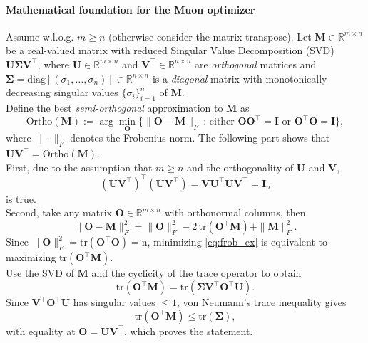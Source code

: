 \paragraph*{Mathematical foundation for the Muon optimizer} Assume w.l.o.g. $m \ge n$ (otherwise consider the matrix transpose). Let $\mathbf{M} \in \mathbb{R}^{m \times n}$ be a real-valued matrix with reduced Singular Value Decomposition (SVD) $\mathbf{U} \mathbf{\Sigma} \mathbf{V}^\top$, where $\mathbf{U} \in \mathbb{R}^{m \times n}$ and $\mathbf{V}^\top \in \mathbb{R}^{n \times n}$ are \emph{orthogonal} matrices and $\mathbf{\Sigma} = \mathrm{diag}[(\sigma_1, \ldots ,\sigma_n)] \in \mathbb{R}^{n \times n}$ is a \emph{diagonal} matrix with monotonically decreasing singular values $\{\sigma_i\}_{i=1}^n$ of $\mathbf{M}$. \\
Define the best \emph{semi-orthogonal} approximation to $\mathbf{M}$ as
\[
\mathrm{Ortho}(\mathbf{M}) := \arg\min_\mathbf{O}\{\| \mathbf{O} - \mathbf{M} \|_F\  :\, \text{either } \mathbf{O}\mathbf{O}^\top = \mathbf{I} \text{ or } \mathbf{O}^\top \mathbf{O} = \mathbf{I} \},
\]
where $\| \cdot\|_F$ denotes the Frobenius norm. The following part shows that $\mathbf{U} \mathbf{V}^\top = \mathrm{Ortho}(\mathbf{M})$. \\
First, due to the assumption that $m \ge n$ and the orthogonality of $\mathbf{U}$ and $\mathbf{V}$, 
\[
    (\mathbf{UV}^\top)^\top (\mathbf{UV}^\top) = \mathbf{V} \mathbf{U}^\top \mathbf{U} \mathbf{V}^\top = \mathbf{I}_n
\]
is true. \\
Second, take any matrix $\mathbf{O} \in \mathbb{R}^{m \times n}$ with orthonormal columns, then
\begin{equation}\label{eq:frob_ex}
    \| \mathbf{O} - \mathbf{M} \|_F^2  = \| \mathbf{O}\|_F^2 - 2 \,\mathrm{tr(\mathbf{O}^\top \mathbf{M})} + \|\mathbf{M} \|_F^2.
\end{equation}
Since $\| \mathbf{O} \|_F^2 = \mathrm{tr(\mathbf{O}^\top \mathbf{O}) = n}$, minimizing \eqref{eq:frob_ex} is equivalent to maximizing $\mathrm{tr(\mathbf{O}^\top \mathbf{M})}$. \\
Use the SVD of $\mathbf{M}$ and the cyclicity of the $\mathrm{trace}$ operator to obtain 
\[
    \mathrm{tr}(\mathbf{O}^\top \mathbf{M}) = \mathrm{tr}(\mathbf{\Sigma} \mathbf{V}^\top \mathbf{O}^\top \mathbf{U}).
\]
Since $\mathbf{V}^\top \mathbf{O}^\top \mathbf{U}$ has singular values $\le 1$, von Neumann's trace inequality gives 
\[
    \mathrm{tr}(\mathbf{O}^\top \mathbf{M}) \le \mathrm{tr}(\mathbf{\Sigma}),
\]
with equality at $\mathbf{O} = \mathbf{UV}^\top$, which proves the statement. \\
